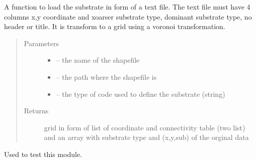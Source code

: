 \documentclass[letterpaper,10pt,english]{sphinxmanual}
\begin{document}
\begin{fulllineitems}
\label{\detokenize{index:src.substrate.load_sub_txt}}
A function to load the substrate in form of a text file. The text file must have 4 columns x,y coordinate and
xoarser substrate type, dominant substrate type, no header or title. It is transform to a grid using a voronoi
transformation.
\begin{quote}\begin{description}
\item[{Parameters}] \leavevmode\begin{itemize}
\item {} 
 -- the name of the shapefile

\item {} 
 -- the path where the shapefile is

\item {} 
 -- the type of code used to define the substrate (string)

\end{itemize}

\item[{Returns}] \leavevmode
grid in form of list of coordinate and connectivity table (two list)
and an array with substrate type and (x,y,sub) of the orginal data

\end{description}\end{quote}

\end{fulllineitems}


\begin{fulllineitems}
\label{\detokenize{index:src.substrate.main}}
Used to test this module.

\end{fulllineitems}

\end{document}
